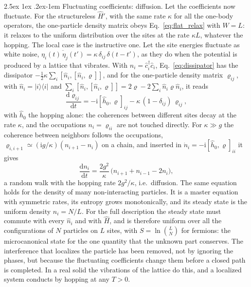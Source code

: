 \documentclass[10pt,a4paper]{article}
\makeatletter
\renewcommand{\paragraph}{\@startsection{paragraph}{4}{\z@}%
  {2.5ex \@plus 1ex \@minus .2ex}{-1em}%
  {\normalfont\fontsize{14pt}{17pt}\selectfont\bfseries}}
\newcommand{\dd}{\mathrm{d}}
\newcommand{\ii}{\mathrm{i}}
\makeatother
\begin{document}
\paragraph{Fluctuating coefficients: diffusion.}
Let the coefficients now fluctuate.
For the structureless $ \hat H' $, with the same rate $ \kappa $ for all the one-body operators, the one-particle density matrix obeys Eq.~\eqref{eq:flat_relax} with $ W = L $: it relaxes to the uniform distribution over the sites at the rate $ \kappa L $, whatever the hopping.
The local case is the instructive one.
Let the site energies fluctuate as white noise, $ \overline{\eta_i(t)\,\eta_j(t')} = \kappa\,\delta_{ij}\,\delta(t - t') $, as they do when the potential is produced by a lattice that vibrates.
With $ \hat n_i = \hat c_i^\dagger\hat c_i $, Eq.~\eqref{eq:dissipator} has the dissipator $ -\tfrac12\kappa\sum_i[\hat n_i, [\hat n_i, \varrho]] $, and for the one-particle density matrix $ \varrho_{ij} $, with $ \hat n_i = |i\rangle\langle i| $ and $ \sum_i[\hat n_i, [\hat n_i, \varrho]] = 2\varrho - 2\sum_i\hat n_i\varrho\hat n_i $, it reads
\[
  \frac{\dd\varrho_{ij}}{\dd t} = -\ii[\hat h_0, \varrho]_{ij} - \kappa\,(1 - \delta_{ij})\,\varrho_{ij} ,
\]
with $ \hat h_0 $ the hopping alone: the coherences between different sites decay at the rate $ \kappa $, and the occupations $ n_i = \varrho_{ii} $ are not touched directly.
For $ \kappa \gg g $ the coherence between neighbors follows the occupations, $ \varrho_{i,i+1} \simeq (\ii g/\kappa)(n_{i+1} - n_i) $ on a chain, and inserted in $ \dot n_i = -\ii[\hat h_0, \varrho]_{ii} $ it gives
\[
  \frac{\dd n_i}{\dd t} = \frac{2g^{2}}{\kappa}\,\big(n_{i+1} + n_{i-1} - 2n_i\big) ,
\]
a random walk with the hopping rate $ 2g^{2}/\kappa $, i.e.\ diffusion.
The same equation holds for the density of many non-interacting particles.
It is a master equation with symmetric rates, its entropy grows monotonically, and its steady state is the uniform density $ n_i = N/L $.
For the full description the steady state must commute with every $ \hat n_i $ and with $ \hat H $, and is therefore uniform over all the configurations of $ N $ particles on $ L $ sites, with $ S = \ln\binom{L}{N} $ for fermions: the microcanonical state for the one quantity that the unknown part conserves.
The interference that localizes the particle has been removed, not by ignoring the phases, but because the fluctuating coefficients change them before a closed path is completed.
In a real solid the vibrations of the lattice do this, and a localized system conducts by hopping at any $ T > 0 $.
\end{document}
